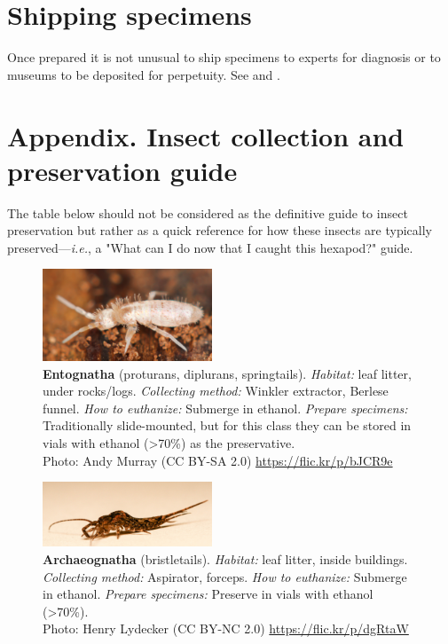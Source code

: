 \documentclass[letterpaper, 11pt]{article}
\begin{document}
\section*{Shipping specimens}
Once prepared it is not unusual to ship specimens to experts for diagnosis or to museums to be deposited for perpetuity. See \cite{packinginsects} and \cite{MacraeWebpage}.

\FloatBarrier



\clearpage
\section*{Appendix. Insect collection and preservation guide}
The table below should not be considered as the definitive guide to insect preservation but rather as a quick reference for how these insects are typically preserved---\textit{i.e.}, a "What can I do now that I caught this hexapod?" guide.

\begin{figure}
  \caption{\textbf{Entognatha} (proturans, diplurans, springtails). \textit{Habitat:} leaf litter, under rocks/logs. \textit{Collecting method:} Winkler extractor, Berlese funnel. \textit{How to euthanize:} Submerge in ethanol. \textit{Prepare specimens:} Traditionally slide-mounted, but for this class they can be stored in vials with ethanol (\textgreater70\%) as the preservative.\\ Photo: Andy Murray (CC BY-SA 2.0) \url{https://flic.kr/p/bJCR9e}}
  \includegraphics[width=0.45\textwidth]{Collembola}
\end{figure}

\begin{figure}
  \caption{\textbf{Archaeognatha} (bristletails). \textit{Habitat:} leaf litter, inside buildings. \textit{Collecting method:} Aspirator, forceps. \textit{How to euthanize:} Submerge in ethanol. \textit{Prepare specimens:} Preserve in vials with ethanol (\textgreater70\%).\\ Photo: Henry Lydecker (CC BY-NC 2.0) \url{https://flic.kr/p/dgRtaW}}
  \includegraphics[width=0.45\textwidth]{Archeognatha}
\end{figure}
\end{document}
